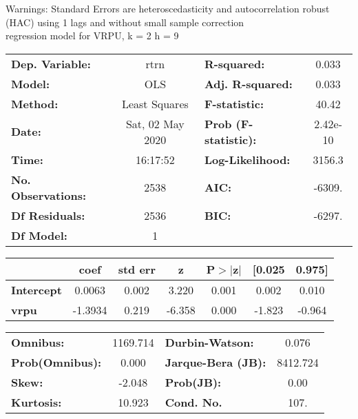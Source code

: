 Warnings: \newline
 [1] Standard Errors are heteroscedasticity and autocorrelation robust (HAC) using 1 lags and without small sample correction\\ 

regression model for VRPU, k = 2 h = 9\begin{center}
\begin{tabular}{lclc}
\toprule
\textbf{Dep. Variable:}    &       rtrn       & \textbf{  R-squared:         } &     0.033   \\
\textbf{Model:}            &       OLS        & \textbf{  Adj. R-squared:    } &     0.033   \\
\textbf{Method:}           &  Least Squares   & \textbf{  F-statistic:       } &     40.42   \\
\textbf{Date:}             & Sat, 02 May 2020 & \textbf{  Prob (F-statistic):} &  2.42e-10   \\
\textbf{Time:}             &     16:17:52     & \textbf{  Log-Likelihood:    } &    3156.3   \\
\textbf{No. Observations:} &        2538      & \textbf{  AIC:               } &    -6309.   \\
\textbf{Df Residuals:}     &        2536      & \textbf{  BIC:               } &    -6297.   \\
\textbf{Df Model:}         &           1      & \textbf{                     } &             \\
\bottomrule
\end{tabular}
\begin{tabular}{lcccccc}
                   & \textbf{coef} & \textbf{std err} & \textbf{z} & \textbf{P$> |$z$|$} & \textbf{[0.025} & \textbf{0.975]}  \\
\midrule
\textbf{Intercept} &       0.0063  &        0.002     &     3.220  &         0.001        &        0.002    &        0.010     \\
\textbf{vrpu}      &      -1.3934  &        0.219     &    -6.358  &         0.000        &       -1.823    &       -0.964     \\
\bottomrule
\end{tabular}
\begin{tabular}{lclc}
\textbf{Omnibus:}       & 1169.714 & \textbf{  Durbin-Watson:     } &    0.076  \\
\textbf{Prob(Omnibus):} &   0.000  & \textbf{  Jarque-Bera (JB):  } & 8412.724  \\
\textbf{Skew:}          &  -2.048  & \textbf{  Prob(JB):          } &     0.00  \\
\textbf{Kurtosis:}      &  10.923  & \textbf{  Cond. No.          } &     107.  \\
\bottomrule
\end{tabular}
\end{center}

